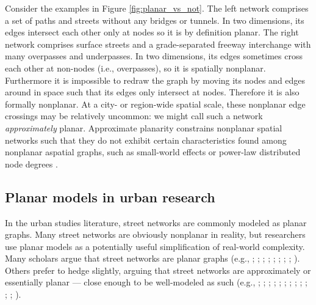 \documentclass[Afour,sageh,times]{sagej}
\begin{document}
Consider the examples in Figure \ref{fig:planar_vs_not}. The left network comprises a set of paths and streets without any bridges or tunnels. In two dimensions, its edges intersect each other only at nodes so it is by definition planar. The right network comprises surface streets and a grade-separated freeway interchange with many overpasses and underpasses. In two dimensions, its edges sometimes cross each other at non-nodes (i.e., overpasses), so it is spatially nonplanar. Furthermore it is impossible to redraw the graph by moving its nodes and edges around in space such that its edges only intersect at nodes. Therefore it is also formally nonplanar. At a city- or region-wide spatial scale, these nonplanar edge crossings may be relatively uncommon: we might call such a network \emph{approximately} planar. Approximate planarity constrains nonplanar spatial networks such that they do not exhibit certain characteristics found among nonplanar aspatial graphs, such as small-world effects or power-law distributed node degrees \citep{crucitti_centrality_2006,fischer_spatial_2014}.

\subsection{Planar models in urban research}

In the urban studies literature, street networks are commonly modeled as planar graphs. Many street networks are obviously nonplanar in reality, but researchers use planar models as a potentially useful simplification of real-world complexity. Many scholars argue that street networks are planar graphs (e.g., \citealp[p.~18]{batty_network_2005}; \citealp[p.~521]{buhl_topological_2006}; \citealp[p.~1]{hu_topological_2008}; \citealp[p.~259]{masucci_random_2009}; \citealp[p.~114]{porta_networks_2010}; \citealp[p.~3]{strano_elementary_2012}; \citealp[p.~1]{masucci_limited_2013}; \citealp[p.~1074]{strano_urban_2013}; \citealp[p.~168]{law_defining_2017}). Others prefer to hedge slightly, arguing that street networks are approximately or essentially planar --- close enough to be well-modeled as such (e.g., \citealp[p.~6]{dill_measuring_2004}; \citealp[p.~3]{cardillo_structural_2006};  \citealp[p.~340]{xie_measuring_2007}; \citealp[p.~1]{barthelemy_modeling_2008}; \citealp[p.~3]{barthelemy_spatial_2011}; \citealp[pp.~563]{chan_urban_2011}; \citealp[p.~1]{gudmundsson_entropy_2013}; \citealp[p.~1]{viana_simplicity_2013}; \citealp[p.~2]{louf_typology_2014}; \citealp[p.~2191]{zhong_detecting_2014}; \citealp[p.~2]{wang_resilience_2015}; \citealp[p.~42]{aldous_routed_2016}; \citealp[p.~257]{barthelemy_paths_2017}).
\end{document}

